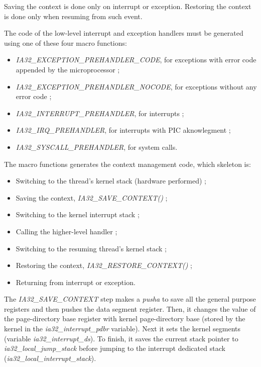 Saving the context is done only on interrupt or exception. Restoring
the context is done only when resuming from such event.

The code of the low-level interrupt and exception handlers must be
generated using one of these four macro functions:

\begin{itemize}
\item \textit{IA32\_EXCEPTION\_PREHANDLER\_CODE}, for exceptions with error
code appended by the microprocessor ;
\item \textit{IA32\_EXCEPTION\_PREHANDLER\_NOCODE}, for exceptions without
any error code ;
\item \textit{IA32\_INTERRUPT\_PREHANDLER}, for interrupts ;
\item \textit{IA32\_IRQ\_PREHANDLER}, for interrupts with PIC aknowlegment ;
\item \textit{IA32\_SYSCALL\_PREHANDLER}, for system calls.
\end{itemize}

The macro functions generates the context management code, which
skeleton is:

\begin{itemize}
\item Switching to the thread's kernel stack (hardware performed) ;
\item Saving the context, \textit{IA32\_SAVE\_CONTEXT()} ;
\item Switching to the kernel interrupt stack ;
\item Calling the higher-level handler ;
\item Switching to the resuming thread's kernel stack ;
\item Restoring the context, \textit{IA32\_RESTORE\_CONTEXT()} ;
\item Returning from interrupt or exception.
\end{itemize}

The \textit{IA32\_SAVE\_CONTEXT} step makes a \textit{pusha} to save
all the general purpose registers and then pushes the data segment
register. Then, it changes the value of the page-directory base
register with kernel page-directory base (stored by the kernel in the
\textit{ia32\_interrupt\_pdbr} variable). Next it sets the kernel
segments (variable \textit{ia32\_interrupt\_ds}). To finish, it saves
the current stack pointer to \textit{ia32\_local\_jump\_stack} before
jumping to the interrupt dedicated stack
(\textit{ia32\_local\_interrupt\_stack}).


